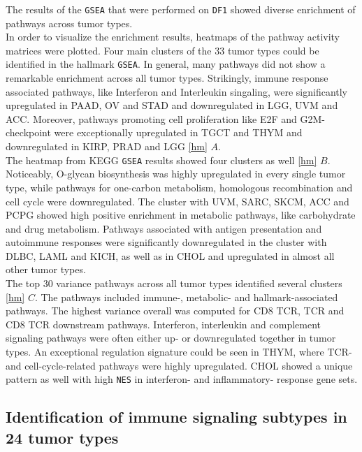 \documentclass[
  parskip,
  oneside]{scrreprt}
\begin{document}
The results of the \texttt{GSEA} that were performed on \texttt{DF1}
showed diverse enrichment of pathways across tumor types.\\
In order to visualize the enrichment results, heatmaps of the pathway
activity matrices were plotted. Four main clusters of the 33 tumor types
could be identified in the hallmark \texttt{GSEA}. In general, many
pathways did not show a remarkable enrichment across all tumor types.
Strikingly, immune response associated pathways, like Interferon and
Interleukin singaling, were significantly upregulated in PAAD, OV and
STAD and downregulated in LGG, UVM and ACC. Moreover, pathways promoting
cell proliferation like E2F and G2M-checkpoint were exceptionally
upregulated in TGCT and THYM and downregulated in KIRP, PRAD and LGG
\cref{hm} \(A\).\\
The heatmap from KEGG \texttt{GSEA} results showed four clusters as well
\cref{hm} \(B\). Noticeably, O-glycan biosynthesis was highly
upregulated in every single tumor type, while pathways for one-carbon
metabolism, homologous recombination and cell cycle were downregulated.
The cluster with UVM, SARC, SKCM, ACC and PCPG showed high positive
enrichment in metabolic pathways, like carbohydrate and drug metabolism.
Pathways associated with antigen presentation and autoimmune responses
were significantly downregulated in the cluster with DLBC, LAML and
KICH, as well as in CHOL and upregulated in almost all other tumor
types.\\
The top 30 variance pathways across all tumor types identified several
clusters \cref{hm} \(C\). The pathways included immune-, metabolic- and
hallmark-associated pathways. The highest variance overall was computed
for CD8 TCR, TCR and CD8 TCR downstream pathways. Interferon,
interleukin and complement signaling pathways were often either up- or
downregulated together in tumor types. An exceptional regulation
signature could be seen in THYM, where TCR- and cell-cycle-related
pathways were highly upregulated. CHOL showed a unique pattern as well
with high \texttt{NES} in interferon- and inflammatory- response gene
sets.

\hypertarget{identification-of-immune-signaling-subtypes-in-24-tumor-types}{%
\subsection{Identification of immune signaling subtypes in 24 tumor
types}\label{identification-of-immune-signaling-subtypes-in-24-tumor-types}}
\end{document}
